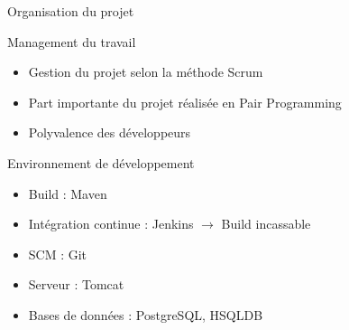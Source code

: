 \begin{frame}
	\begin{center}
		\huge{Organisation du projet}
	\end{center}
\end{frame}

\begin{frame}{Management du travail}
	\begin{itemize}
		\item Gestion du projet selon la m\'ethode Scrum
		\item Part importante du projet r\'ealis\'ee en Pair Programming
		\item Polyvalence des d\'eveloppeurs
	\end{itemize}
\end{frame}

\begin{frame}{Environnement de d\'eveloppement}
	\begin{itemize}
		\item Build : Maven
		\item Int\'egration continue : Jenkins $\rightarrow$ Build incassable
		\item SCM : Git
		\item Serveur : Tomcat
		\item Bases de donn\'ees : PostgreSQL, HSQLDB
	\end{itemize}
\end{frame}


